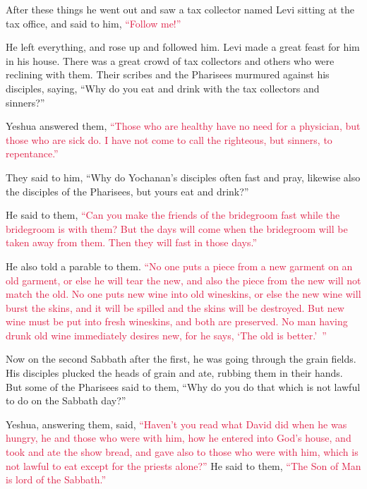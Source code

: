 \myverse{}After these things he went out and saw a tax collector named
Levi sitting at the tax office, and said to him,
\textcolor{crimson}{“Follow me!”}

\myverse{}He left everything, and rose up and followed him.
\myverse{}Levi made a great feast for him in his house. There was a great crowd of tax
collectors and others who were reclining with them.
\myverse{}Their scribes and the Pharisees murmured against his disciples, saying, “Why
do you eat and drink with the tax collectors and sinners?”

\myverse{}Yeshua answered them,
\textcolor{crimson}{“Those who are healthy have no need for a physician, but those who are sick do.
}
\myverse{}\textcolor{crimson}{I have not come to call the righteous, but sinners, to repentance.”
}

\myverse{}They said to him, “Why do Yochanan’s disciples often fast and
pray, likewise also the disciples of the Pharisees, but yours eat and drink?”

\myverse{}He said to them,
\textcolor{crimson}{“Can you make the friends of the bridegroom fast while the bridegroom is with them?
}
\myverse{}\textcolor{crimson}{But the days will come when the bridegroom will be taken away from them.
	Then they will fast in those days.”}

\myverse{}He also told a parable to them.
\textcolor{crimson}{“No one puts a piece from a new garment on an old garment, or else he will tear the new, and also
	the piece from the new will not match the old.
}
\myverse{}\textcolor{crimson}{No one puts new wine into old wineskins, or else the new wine will burst
	the skins, and it will be spilled and the skins will be destroyed.
}
\myverse{}\textcolor{crimson}{But new wine must be put into fresh wineskins, and both are preserved.
}
\myverse{}\textcolor{crimson}{No man having drunk old wine immediately desires new, for he says, ‘The
	old is better.’ ”}


\mychapter{} \myverse*{}Now on the second Sabbath after the first, he was going through
the grain fields. His disciples plucked the heads of grain and ate, rubbing them in their hands.
\myverse{}But some of the Pharisees said to them, “Why do you do that which is not lawful
to do on the Sabbath day?”

\myverse{}Yeshua, answering them, said,
\textcolor{crimson}{“Haven’t you read what David did when he was hungry, he and those who were with him,
}
\myverse{}\textcolor{crimson}{how he entered into God’s house, and took and ate the show bread, and gave
	also to those who were with him, which is not lawful to eat except for the priests alone?”}
\myverse{}He said to them,
\textcolor{crimson}{“The Son of Man is lord of the Sabbath.”}

